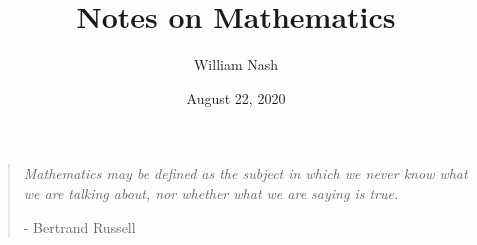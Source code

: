 \documentclass[11pt]{book}
\title{Notes on Mathematics}
\author{William Nash}
\date{August 22, 2020}
\begin{document}
\maketitle \clearpage

\vspace*{\fill}
\thispagestyle{empty} %
\begin{quotation}
	\em %
	Mathematics may be defined as the subject in which we never know what we are talking about, nor whether what we are saying is true.
	\medskip
	
	\raggedleft
	- Bertrand Russell
\end{quotation}
\vspace*{\fill}



\tableofcontents









{}

\end{document}
